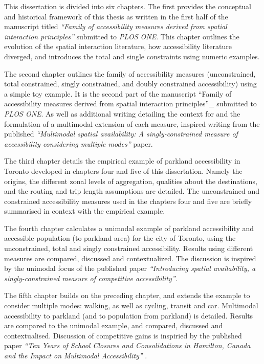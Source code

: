\documentclass[
11pt, %
oneside, %
english, %
singlespacing, %
]{macthesis} %
\begin{document}
This dissertation is divided into six chapters. The first provides the conceptual and historical framework of this thesis as written in the first half of the manuscript titled \emph{``Family of accessibility measures derived from spatial interaction principles''} submitted to \emph{PLOS ONE}. This chapter outlines the evolution of the spatial interaction literature, how accessibility literature diverged, and introduces the total and single constraints using numeric examples.

The second chapter outlines the family of accessibility measures (unconstrained, total constrained, singly constrained, and doubly constrained accessibility) using a simple toy example. It is the second part of the manuscript ``Family of accessibility measures derived from spatial interaction principles''\_ submitted to \emph{PLOS ONE}. As well as additional writing detailing the context for and the formulation of a multimodal extension of each measure, inspired writing from the published \emph{``Multimodal spatial availability: A singly-constrained measure of accessibility considering multiple modes''} paper.

The third chapter details the empirical example of parkland accessibility in Toronto developed in chapters four and five of this dissertation. Namely the origins, the different zonal levels of aggregation, qualities about the destinations, and the routing and trip length assumptions are detailed. The unconstrained and constrained accessibility measures used in the chapters four and five are briefly summarised in context with the empirical example.

The fourth chapter calculates a unimodal example of parkland accessibility and accessible population (to parkland area) for the city of Toronto, using the unconstrained, total and singly constrained accessibility. Results using different measures are compared, discussed and contextualized. The discussion is inspired by the unimodal focus of the published paper \emph{``Introducing spatial availability, a singly-constrained measure of competitive accessibility''}.

The fifth chapter builds on the preceding chapter, and extends the example to consider multiple modes: walking, as well as cycling, transit and car. Multimodal accessibility to parkland (and to population from parkland) is detailed. Results are compared to the unimodal example, and compared, discussed and contextualised. Discussion of competitive gains is inspiried by the published paper \emph{``Ten Years of School Closures and Consolidations in Hamilton, Canada and the Impact on Multimodal Accessibility''} .
\end{document}
